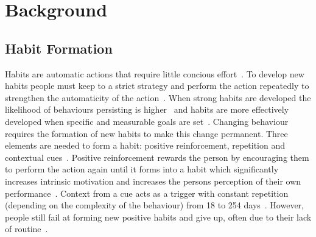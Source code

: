 \newpage

\section{Background}

\subsection{Habit Formation}
Habits are automatic actions that require little concious effort~\cite{article_the_habitual_consumer}. To develop new habits people must keep to a strict strategy and perform the action repeatedly to strengthen the automaticity of the action~\cite{article_promoting_habit_formation}. When strong habits are developed the likelihood of behaviours persisting is higher~\cite{putting_habit_into_practice} and habits are more effectively developed when specific and measurable goals are set~\cite{habits_better_when_have_specific_and_measurable_goals}. Changing behaviour requires the formation of new habits to make this change permanent. Three elements are needed to form a habit: positive reinforcement, repetition and contextual cues~\cite{article_experiences_of_habit_formation}. Positive reinforcement rewards the person by encouraging them to perform the action again until it forms into a habit which significantly increases intrinsic motivation and increases the persons perception of their own performance~\cite{positive_reinforcement_pro}. Context from a cue acts as a trigger with constant repetition (depending on the complexity of the behaviour) from 18 to 254 days~\cite{article_how_habits_formed_modelling_habit_formation}.
However, people still fail at forming new positive habits and give up, often due to their lack of routine~\cite{article_the_habitual_consumer, article_promoting_habit_formation}.


